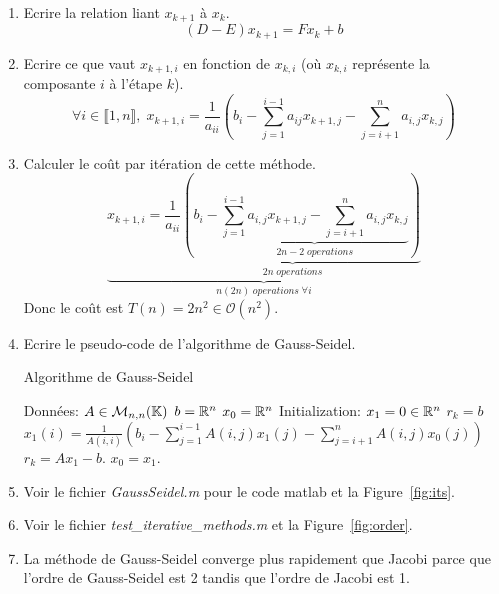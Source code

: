 \documentclass[a4paper,10pt]{article}
\begin{document}
\begin{enumerate}
    \item Ecrire la relation liant $x_{k+1}$ à $x_k$.
\[
(D - E)x_{k + 1} = F x_k + b
\]

    \item Ecrire ce que vaut $x_{k+1,i}$ en fonction de $x_{k,i}$ (où $x_{k,i}$ représente la
composante $i$ à l'étape $k$).
\[
\forall i \in \llbracket 1, n \rrbracket, \;
x_{k + 1, i} = \frac{1}{a_{ii}}
\left( b_i -
\sum_{j = 1}^{i - 1} a_{ij} x_{k + 1, j} -
\sum_{j = i + 1}^n a_{i, j} x_{k, j}
\right)
\]

    \item Calculer le coût par itération de cette méthode.
\[
\underbrace{x_{k + 1, i} = \underbrace{\frac{1}{a_{ii}}
\left( b_i -
\underbrace{\sum_{j = 1}^{i - 1} a_{i, j} x_{k + 1, j} -
\sum_{j = i + 1}^n a_{i, j} x_{k, j}}_{2n - 2\; operations}
\right)}_{2n\; operations}}_{n(2n)\; operations\; \forall i}
\]
Donc le coût est $T(n) = 2n^2 \in \mathcal{O}(n^2)$.

    \item Ecrire le pseudo-code de l'algorithme de Gauss-Seidel.

\begin{algorithm}
\caption{Algorithme de Gauss-Seidel}
\begin{algorithmic}
\STATE Données:
\STATE $A \in \mathcal{M}_{n, n}(\mathbb{K})$
\STATE $b = \mathbb{R}^n$
\STATE $x_0 = \mathbb{R}^n$
\STATE Initialization:
\STATE $x_1 = 0 \in \mathbb{R}^n$
\STATE $r_k = b$
    \STATE $x_1(i) = \frac{1}{A(i, i)}
        \left( b_i -
            \sum_{j = 1}^{i - 1} A(i, j) x_1(j) -
            \sum_{j = i + 1}^n A(i, j) x_0(j)
        \right)$
    \STATE $r_k = Ax_1 - b$.
    \STATE $x_0 = x_1$.
\ENDWHILE
\end{algorithmic}
\end{algorithm}

    \item Voir le fichier \emph{GaussSeidel.m} pour le code matlab et la Figure~\ref{fig:its}.

    \item Voir le fichier \emph{test\_iterative\_methods.m}  et la Figure~\ref{fig:order}.

    \item La méthode de Gauss-Seidel converge plus rapidement que Jacobi
    parce que l'ordre de Gauss-Seidel est 2 tandis que l'ordre de Jacobi est 1.

\end{enumerate}
\end{document}
